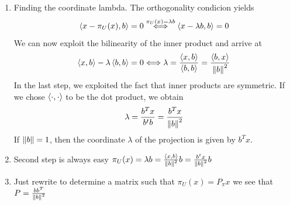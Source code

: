 \begin{enumerate}
    \item Finding the coordinate lambda. The orthogonality condicion yields
    \[ 
        \left\langle x-\pi_U(x),b\right\rangle= 0 \overset{\pi_U(x)=\lambda b}{\Longleftrightarrow } \left\langle x-\lambda b, b\right\rangle = 0
    \]We can now exploit the bilinearity of the inner product and arrive at
    \[ 
        \left\langle x,b\right\rangle -\lambda \left\langle b,b\right\rangle=0 \Longleftrightarrow \lambda = \frac{\left\langle x,b\right\rangle}{\left\langle b,b\right\rangle} = \frac{\left\langle b,x\right\rangle}{\left\lVert b\right\rVert^2} 
    \]In the last step, we exploited the fact that inner products are symmetric. If we chose $\left\langle\cdot,\cdot\right\rangle$ to be the dot product, we obtain
    \[ 
        \lambda = \frac{b^Tx}{b^tb}= \frac{b^Tx}{\left\lVert b\right\rVert^2} 
    \]If $\left\lVert b\right\rVert=1$, then the coordinate $\lambda$ of the projection is given by $b^Tx$.
    
    \item Second step is always easy $ \pi_U(x) = \lambda b = \frac{\left\langle x,b\right\rangle}{\left\lVert b\right\rVert^2}b = \frac{b^tx}{\left\lVert b\right\rVert^2}b $ 
    \item Just rewrite to determine a matrix such that $ \pi_U(x) = P_\pi x$ we see that $P = \frac{b b^T}{\left\lVert b\right\rVert^2} $ 
\end{enumerate}
